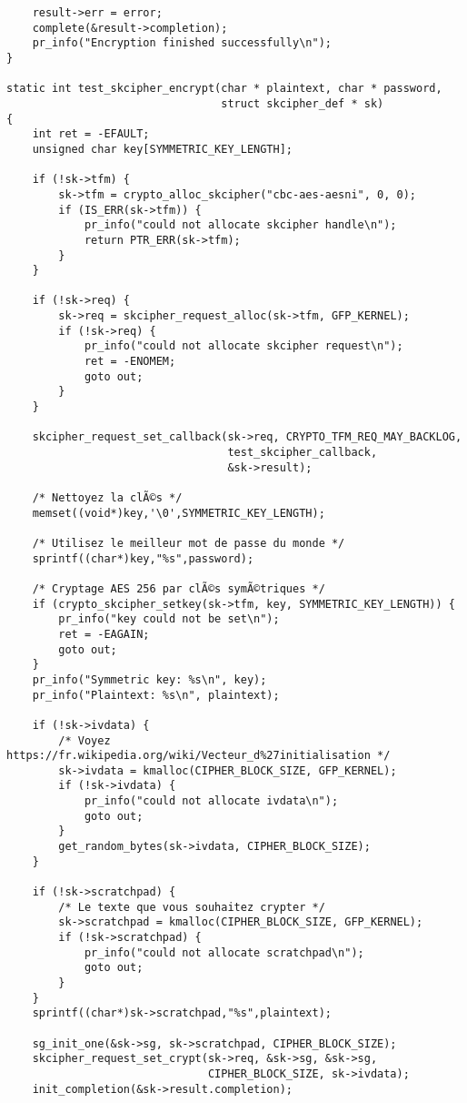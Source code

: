 \documentclass[11pt]{article}
\begin{document}
\begin{verbatim}
    result->err = error;
    complete(&result->completion);
    pr_info("Encryption finished successfully\n");
}

static int test_skcipher_encrypt(char * plaintext, char * password,
                                 struct skcipher_def * sk)
{
    int ret = -EFAULT;
    unsigned char key[SYMMETRIC_KEY_LENGTH];

    if (!sk->tfm) {
        sk->tfm = crypto_alloc_skcipher("cbc-aes-aesni", 0, 0);
        if (IS_ERR(sk->tfm)) {
            pr_info("could not allocate skcipher handle\n");
            return PTR_ERR(sk->tfm);
        }
    }

    if (!sk->req) {
        sk->req = skcipher_request_alloc(sk->tfm, GFP_KERNEL);
        if (!sk->req) {
            pr_info("could not allocate skcipher request\n");
            ret = -ENOMEM;
            goto out;
        }
    }

    skcipher_request_set_callback(sk->req, CRYPTO_TFM_REQ_MAY_BACKLOG,
                                  test_skcipher_callback,
                                  &sk->result);

    /* Nettoyez la clÃ©s */
    memset((void*)key,'\0',SYMMETRIC_KEY_LENGTH);

    /* Utilisez le meilleur mot de passe du monde */
    sprintf((char*)key,"%s",password);

    /* Cryptage AES 256 par clÃ©s symÃ©triques */
    if (crypto_skcipher_setkey(sk->tfm, key, SYMMETRIC_KEY_LENGTH)) {
        pr_info("key could not be set\n");
        ret = -EAGAIN;
        goto out;
    }
    pr_info("Symmetric key: %s\n", key);
    pr_info("Plaintext: %s\n", plaintext);

    if (!sk->ivdata) {
        /* Voyez https://fr.wikipedia.org/wiki/Vecteur_d%27initialisation */
        sk->ivdata = kmalloc(CIPHER_BLOCK_SIZE, GFP_KERNEL);
        if (!sk->ivdata) {
            pr_info("could not allocate ivdata\n");
            goto out;
        }
        get_random_bytes(sk->ivdata, CIPHER_BLOCK_SIZE);
    }

    if (!sk->scratchpad) {
        /* Le texte que vous souhaitez crypter */
        sk->scratchpad = kmalloc(CIPHER_BLOCK_SIZE, GFP_KERNEL);
        if (!sk->scratchpad) {
            pr_info("could not allocate scratchpad\n");
            goto out;
        }
    }
    sprintf((char*)sk->scratchpad,"%s",plaintext);

    sg_init_one(&sk->sg, sk->scratchpad, CIPHER_BLOCK_SIZE);
    skcipher_request_set_crypt(sk->req, &sk->sg, &sk->sg,
                               CIPHER_BLOCK_SIZE, sk->ivdata);
    init_completion(&sk->result.completion);


\end{verbatim}
\end{document}
